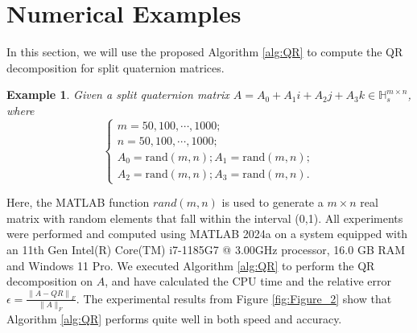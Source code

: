 \documentclass[12pt]{article}
\newtheorem{example}[theorem]{Example}
\begin{document}
\section{Numerical Examples}

In this section, we will use the proposed Algorithm \ref{alg:QR} to compute the QR decomposition for split quaternion matrices.
\begin{example}
    Given a split quaternion matrix $A = A_{0}+A_{1}i+A_{2}j+A_{3}k\in \mathbb{H}_s^{m\times n}$, where
    \begin{equation}
       \begin{cases}
            m = 50,100,\cdots,1000;\\
            n = 50,100,\cdots,1000;  \\
            A_{0}=\text{rand}(m,n);
            A_{1}=\text{rand}(m,n); \\
            A_{2}=\text{rand}(m,n);
            A_{3}=\text{rand}(m,n).
        \end{cases} \label{eq:example2}
    \end{equation}
\end{example}
Here, the MATLAB function $rand(m,n)$ is used to generate a $m \times n$ real matrix with random elements that fall within the interval (0,1).  All experiments were performed and computed using MATLAB 2024a on a system equipped with an 11th Gen Intel(R) Core(TM) i7-1185G7 @ 3.00GHz processor, 16.0 GB RAM and Windows 11 Pro. We executed Algorithm \ref{alg:QR} to perform the QR decomposition on $A$, and have calculated the CPU time and the relative error
$\epsilon = \frac{\left\|A - Q R\right\|_{F}}{\|A\|_{F}}.$
The experimental results from Figure \ref{fig:Figure_2} show that Algorithm \ref{alg:QR} performs quite well in both speed and accuracy. 
\end{document}
